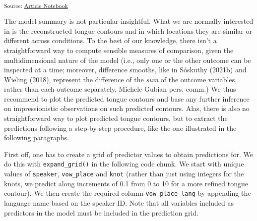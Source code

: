 \documentclass[
]{interact}
\begin{document}
\textsubscript{Source:
\href{https://stefanocoretta.github.io/mv_uti/index.qmd.html}{Article
Notebook}}

The model summary is not particular insightful. What we are normally
interested in is the reconstructed tongue contours and in which
locations they are similar or different across conditions. To the best
of our knowledge, there isn't a straightforward way to compute sensible
measures of comparison, given the multidimensional nature of the model
(i.e., only one or the other outcome can be inspected at a time;
moreover, difference smooths, like in Sóskuthy (2021b) and Wieling
(2018), represent the difference of the \emph{sum} of the outcome
variables, rather than each outcome separately, Michele Gubian pers.
comm.) We thus recommend to plot the predicted tongue contours and base
any further inference on impressionistic observations on such predicted
contours. Alas, there is also no straightforward way to plot predicted
tongue contours, but to extract the predictions following a step-by-step
procedure, like the one illustrated in the following paragraphs.

First off, one has to create a grid of predictor values to obtain
predictions for. We do this with \texttt{expand\_grid()} in the
following code chunk. We start with unique values of \texttt{speaker},
\texttt{vow\_place} and \texttt{knot} (rather than just using integers
for the knots, we predict along increments of 0.1 from 0 to 10 for a
more refined tongue contour). We then create the required column
\texttt{vow\_place\_lang} by appending the language name based on the
speaker ID. Note that all variables included as predictors in the model
must be included in the prediction grid.
\end{document}
